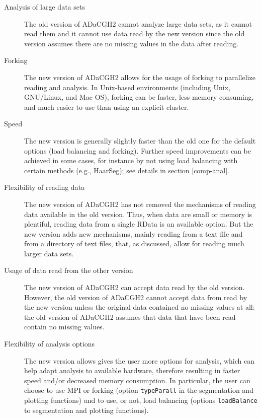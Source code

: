 \documentclass[a4paper,11pt]{article}
\begin{document}
\begin{description}
\item[Analysis of large data sets] The old version of ADaCGH2 cannot
  analyze large data sets, as it cannot read them and it cannot use data
  read by the new version since the old version assumes there are no
  missing values in the data after reading.


\item[Forking] The new version of ADaCGH2 allows for the usage of forking
  to parallelize reading and analysis. In Unix-based environments
  (including Unix, GNU/Linux, and Mac OS), forking can be faster, less
  memory consuming, and much easier to use than using an explicit cluster.


\item[Speed] The new version is generally slightly faster than the old one
  for the default options (load balancing and forking). Further speed
  improvements can be achieved in some cases, for instance by not using
  load balancing with certain methods (e.g., HaarSeg); see details in
  section \ref{comp-anal}.


\item[Flexibility of reading data] The new version of ADaCGH2 has not
  removed the mechanisms of reading data available in the old
  version. Thus, when data are small or memory is plentiful, reading data
  from a single RData is an available option. But the new version adds new
  mechanisms, mainly reading from a text file and from a directory of
  text files, that, as discussed, allow for reading much larger data sets.

\item[Usage of data read from the other version] The new version of
  ADaCGH2 can accept data read by the old version. However, the old
  version of ADaCGH2 cannot accept data from read by the new version
  unless the original data contained no missing values at all: the old
  version of ADaCGH2 assumes that data that have been read contain no
  missing values.


\item[Flexibility of analysis options] The new version allows gives the
  user more options for analysis, which can help adapt analysis to
  available hardware, therefore resulting in faster speed and/or decreased
  memory consumption. In particular, the user can choose to use MPI or
  forking (option \texttt{typeParall} in the segmentation and plotting
  functions) and to use, or not, load balancing (options
  \texttt{loadBalance} to segmentation and plotting functions).


\end{description}
\end{document}
